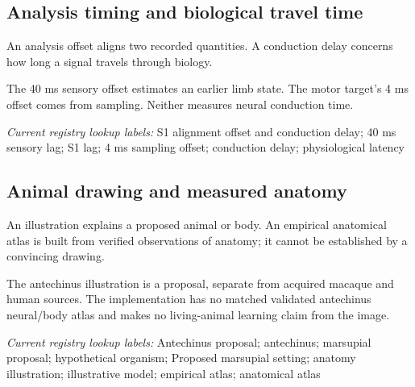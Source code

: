 \begin{samepage}
\subsection*{Analysis timing and biological travel time}
\noindent An analysis offset aligns two recorded quantities. A conduction delay concerns how long a signal travels through biology.\par
\end{samepage}
\begin{samepage}
\noindent The 40 ms sensory offset estimates an earlier limb state. The motor target’s 4 ms offset comes from sampling. Neither measures neural conduction time.\par\nopagebreak[4]

\end{samepage}


\noindent\textit{Current registry lookup labels:} S1 alignment offset and conduction delay; 40 ms sensory lag; S1 lag; 4 ms sampling offset; conduction delay; physiological latency\par

\begin{samepage}
\subsection*{Animal drawing and measured anatomy}
\noindent An illustration explains a proposed animal or body. An empirical anatomical atlas is built from verified observations of anatomy; it cannot be established by a convincing drawing.\par
\end{samepage}
\begin{samepage}
\noindent The antechinus illustration is a proposal, separate from acquired macaque and human sources. The implementation has no matched validated antechinus neural/body atlas and makes no living-animal learning claim from the image.\par\nopagebreak[4]

\end{samepage}


\noindent\textit{Current registry lookup labels:} Antechinus proposal; antechinus; marsupial proposal; hypothetical organism; Proposed marsupial setting; anatomy illustration; illustrative model; empirical atlas; anatomical atlas\par

